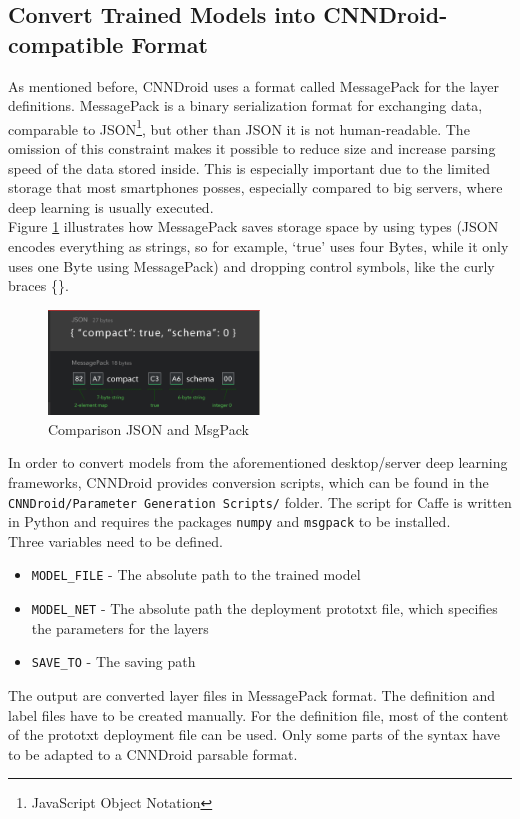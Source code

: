 \subsection{Convert Trained Models into CNNDroid-compatible Format}
As mentioned before, CNNDroid uses a format called MessagePack for the layer definitions. MessagePack is a binary serialization format for exchanging data, comparable to JSON\footnote{JavaScript Object Notation}, but other than JSON it is not human-readable. The omission of this constraint makes it possible to reduce size and increase parsing speed of the data stored inside. This is especially important due to the limited storage that most smartphones posses, especially compared to big servers, where deep learning is usually executed.\\
Figure \ref{fig:json_vs_msgpack} illustrates how MessagePack saves storage space by using types (JSON encodes everything as strings, so for example, `true' uses four Bytes, while it only uses one Byte using MessagePack) and dropping control symbols, like the curly braces \{\}.

\begin{figure}[H]
  \centering
    \includegraphics[width=0.5\textwidth]{json_vs_msgpack.png}
  \caption{Comparison JSON and MsgPack}
  \label{fig:json_vs_msgpack}
\end{figure}

In order to convert models from the aforementioned desktop/server deep learning frameworks, CNNDroid provides conversion scripts, which can be found in the\\
\texttt{CNNDroid/Parameter Generation Scripts/} folder. The script for Caffe is written in Python and requires the packages \lstinline[language=python]{numpy} and \lstinline[language=python]{msgpack} to be installed.\\
Three variables need to be defined.
\begin{itemize}
  \item{\texttt{MODEL\_FILE} - The absolute path to the trained model}
  \item{\texttt{MODEL\_NET} - The absolute path the deployment prototxt file, which specifies the parameters for the layers}
  \item{\texttt{SAVE\_TO} - The saving path}
\end{itemize}
The output are converted layer files in MessagePack format. The definition and label files have to be created manually. For the definition file, most of the content of the prototxt deployment file can be used. Only some parts of the syntax have to be adapted to a CNNDroid parsable format.\\
\newpage
